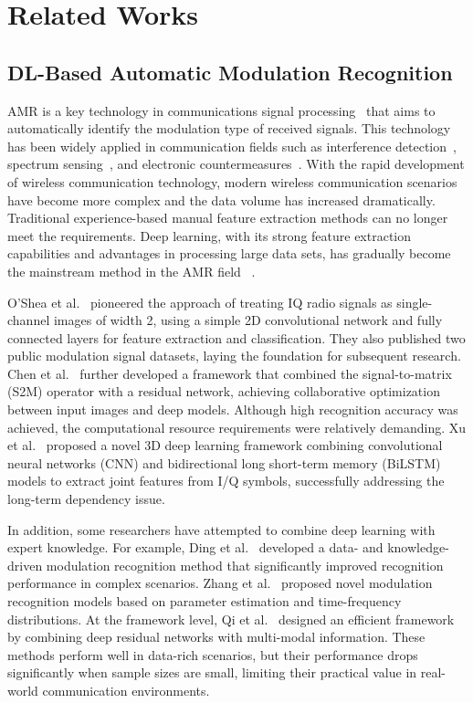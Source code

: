 \section{Related Works}
\label{sec:Related Works}
\subsection{DL-Based Automatic Modulation Recognition}
AMR is a key technology in communications signal processing~\cite{rajendran2018deep} that aims to automatically identify the modulation type of received signals. This technology has been widely applied in communication fields such as interference detection~\cite{van2008electromagnetic,xie2019localization}, spectrum sensing~\cite{long2015fully,wang2018cyber}, and electronic countermeasures~\cite{maglaras2014intrusion,butt2018hybrid}. With the rapid development of wireless communication technology, modern wireless communication scenarios have become more complex and the data volume has increased dramatically. Traditional experience-based manual feature extraction methods can no longer meet the requirements. Deep learning, with its strong feature extraction capabilities and advantages in processing large data sets, has gradually become the mainstream method in the AMR field ~\cite{zhang2021radio}.

O'Shea et al.~\cite{o2016convolutional} pioneered the approach of treating IQ radio signals as single-channel images of width 2, using a simple 2D convolutional network and fully connected layers for feature extraction and classification. They also published two public modulation signal datasets, laying the foundation for subsequent research. Chen et al.~\cite{chen2021signet} further developed a framework that combined the signal-to-matrix (S2M) operator with a residual network, achieving collaborative optimization between input images and deep models. Although high recognition accuracy was achieved, the computational resource requirements were relatively demanding. Xu et al.~\cite{xu2020spatiotemporal} proposed a novel 3D deep learning framework combining convolutional neural networks (CNN) and bidirectional long short-term memory (BiLSTM) models to extract joint features from I/Q symbols, successfully addressing the long-term dependency issue.

In addition, some researchers have attempted to combine deep learning with expert knowledge. For example, Ding et al.~\cite{ding2022data} developed a data- and knowledge-driven modulation recognition method that significantly improved recognition performance in complex scenarios. Zhang et al.~\cite{zhang2021efficient,zhang2018modulation} proposed novel modulation recognition models based on parameter estimation and time-frequency distributions. At the framework level, Qi et al.~\cite{qi2020automatic} designed an efficient framework by combining deep residual networks with multi-modal information. These methods perform well in data-rich scenarios, but their performance drops significantly when sample sizes are small, limiting their practical value in real-world communication environments.

